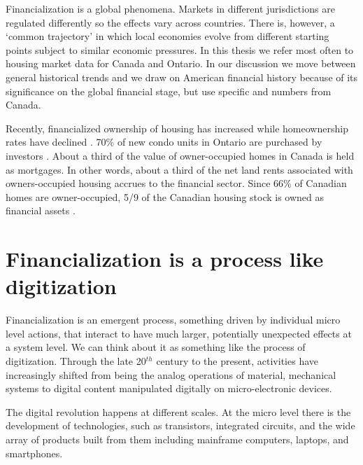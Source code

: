 Financialization is a global phenomena. Markets in different jurisdictions are regulated differently so the effects vary across countries. There is, however, a ‘common trajectory’ \cite{hayCommonTrajectoriesVariable2004}\cite{aalbersConversationLandRent2018} in which local economies evolve from different starting points subject to similar economic pressures.  In this thesis we refer most often to housing market data for Canada and Ontario. In our discussion we move between general historical trends and we draw on American financial history because of its significance on the global financial stage, but use specific and numbers from Canada. 

Recently, financialized ownership of housing has increased while homeownership rates have declined \cite{statisticscanadaBuyRentHousing2022}.
70\% of new condo units in Ontario are purchased by investors \cite{GET_ontario_condo_ownership}.  About a third of the value of  owner-occupied homes in Canada is held as mortgages. In other words, about a third of the net land rents associated with owners-occupied housing accrues to the financial sector. Since 66\% of Canadian homes are owner-occupied,  5/9 of the Canadian housing stock is owned as financial assets \cite{nemtinFinancializationHousingSocial2021}. %


\section{Financialization is a process like digitization}
Financialization is an emergent process, something %
driven by individual micro level actions, that interact to have much larger, potentially unexpected effects at a system level. We can think about it as something like the process of \gls{digitization}. 
Through the late 20$^{th}$ century to the present, activities have increasingly shifted from being the analog operations of material, mechanical systems  to digital content manipulated digitally on micro-electronic devices. 

The digital revolution happens at different scales. At the micro level there is the development of technologies, such as transistors, integrated circuits, and the wide array of products built from them including mainframe computers, laptops, and smartphones.  

